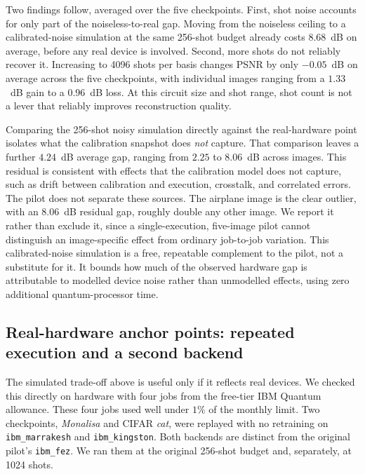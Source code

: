 \documentclass[pdflatex,sn-basic]{sn-jnl}
\begin{document}
Two findings follow, averaged over the five checkpoints. First, shot noise
accounts for only part of the noiseless-to-real gap. Moving from the noiseless
ceiling to a calibrated-noise simulation at the same 256-shot budget already
costs $8.68$~dB on average, before any real device is involved. Second, more
shots do not reliably recover it. Increasing to 4096 shots per basis changes
PSNR by only $-0.05$~dB on average across the five checkpoints, with individual
images ranging from a $1.33$~dB gain to a $0.96$~dB loss. At this circuit size
and shot range, shot count is not a lever that reliably improves reconstruction
quality.

Comparing the 256-shot noisy simulation directly against the real-hardware point
isolates what the calibration snapshot does \emph{not} capture. That comparison
leaves a further $4.24$~dB average gap, ranging from $2.25$ to $8.06$~dB across
images. This residual is consistent
with effects that the calibration model does not capture, such as drift between calibration and execution,
crosstalk, and correlated errors. The pilot does not separate these
sources. The airplane image is the clear outlier, with
an $8.06$~dB residual gap, roughly double any other image. We report it rather
than exclude it, since a single-execution, five-image pilot cannot distinguish an
image-specific effect from ordinary job-to-job variation. This calibrated-noise
simulation is a free, repeatable complement to the pilot, not a substitute for
it. It bounds how much of the observed hardware gap is attributable to modelled
device noise rather than unmodelled effects, using zero additional
quantum-processor time.

\subsection{Real-hardware anchor points: repeated execution and a second backend}
\label{sec:hardware_anchors}

The simulated trade-off above is useful
only if it reflects real devices. We checked this directly on hardware with four
jobs from the free-tier IBM Quantum allowance. These four jobs used well under
$1\%$ of the monthly limit. Two checkpoints, \textit{Monalisa} and CIFAR
\textit{cat}, were replayed with no retraining on \texttt{ibm\_marrakesh} and
\texttt{ibm\_kingston}. Both backends are distinct from the original pilot's
\texttt{ibm\_fez}. We ran them at the original 256-shot budget and, separately,
at 1024 shots.
\end{document}
